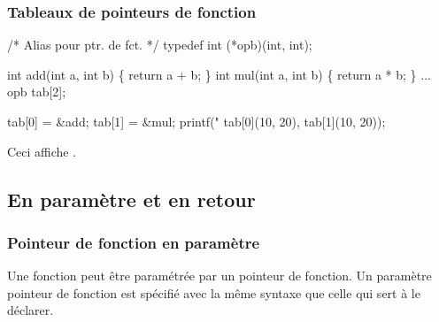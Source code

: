 \begin{frame}[fragile]
\frametitle{Tableaux de pointeurs de fonction}

\begin{multicols}{2}
\begin{semiverbatim}\small
/* Alias pour ptr. de fct. */
typedef int (*opb)(int, int);

int add(int a, int b) \{
    return a + b;
\}
int mul(int a, int b) \{
    return a * b;
\}
...
opb tab[2];

tab[0] = &add;
tab[1] = &mul;
printf("%
    tab[0](10, 20),
    tab[1](10, 20));
\end{semiverbatim}
\end{multicols}
Ceci affiche .
\bigskip

\begin{semiverbatim}\small{}
\end{semiverbatim}
\end{frame}

\subsection{En paramètre et en retour}

\begin{frame}[fragile]
\frametitle{Pointeur de fonction en paramètre}
Une fonction peut être \alert{paramétrée par un pointeur de fonction}.
Un paramètre pointeur de fonction est spécifié avec la même syntaxe que
celle qui sert à le déclarer.
\bigskip

\begin{semiverbatim}\small{}
\end{semiverbatim}
\end{frame}

